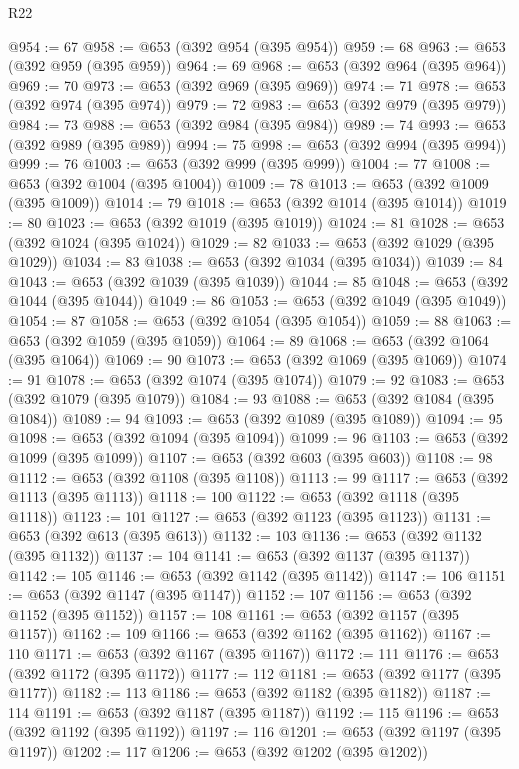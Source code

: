 \begin{lexlean}{R22}
\begin{coremodule}
@954 := 67
@958 := @653 (@392 @954 (@395 @954))
@959 := 68
@963 := @653 (@392 @959 (@395 @959))
@964 := 69
@968 := @653 (@392 @964 (@395 @964))
@969 := 70
@973 := @653 (@392 @969 (@395 @969))
@974 := 71
@978 := @653 (@392 @974 (@395 @974))
@979 := 72
@983 := @653 (@392 @979 (@395 @979))
@984 := 73
@988 := @653 (@392 @984 (@395 @984))
@989 := 74
@993 := @653 (@392 @989 (@395 @989))
@994 := 75
@998 := @653 (@392 @994 (@395 @994))
@999 := 76
@1003 := @653 (@392 @999 (@395 @999))
@1004 := 77
@1008 := @653 (@392 @1004 (@395 @1004))
@1009 := 78
@1013 := @653 (@392 @1009 (@395 @1009))
@1014 := 79
@1018 := @653 (@392 @1014 (@395 @1014))
@1019 := 80
@1023 := @653 (@392 @1019 (@395 @1019))
@1024 := 81
@1028 := @653 (@392 @1024 (@395 @1024))
@1029 := 82
@1033 := @653 (@392 @1029 (@395 @1029))
@1034 := 83
@1038 := @653 (@392 @1034 (@395 @1034))
@1039 := 84
@1043 := @653 (@392 @1039 (@395 @1039))
@1044 := 85
@1048 := @653 (@392 @1044 (@395 @1044))
@1049 := 86
@1053 := @653 (@392 @1049 (@395 @1049))
@1054 := 87
@1058 := @653 (@392 @1054 (@395 @1054))
@1059 := 88
@1063 := @653 (@392 @1059 (@395 @1059))
@1064 := 89
@1068 := @653 (@392 @1064 (@395 @1064))
@1069 := 90
@1073 := @653 (@392 @1069 (@395 @1069))
@1074 := 91
@1078 := @653 (@392 @1074 (@395 @1074))
@1079 := 92
@1083 := @653 (@392 @1079 (@395 @1079))
@1084 := 93
@1088 := @653 (@392 @1084 (@395 @1084))
@1089 := 94
@1093 := @653 (@392 @1089 (@395 @1089))
@1094 := 95
@1098 := @653 (@392 @1094 (@395 @1094))
@1099 := 96
@1103 := @653 (@392 @1099 (@395 @1099))
@1107 := @653 (@392 @603 (@395 @603))
@1108 := 98
@1112 := @653 (@392 @1108 (@395 @1108))
@1113 := 99
@1117 := @653 (@392 @1113 (@395 @1113))
@1118 := 100
@1122 := @653 (@392 @1118 (@395 @1118))
@1123 := 101
@1127 := @653 (@392 @1123 (@395 @1123))
@1131 := @653 (@392 @613 (@395 @613))
@1132 := 103
@1136 := @653 (@392 @1132 (@395 @1132))
@1137 := 104
@1141 := @653 (@392 @1137 (@395 @1137))
@1142 := 105
@1146 := @653 (@392 @1142 (@395 @1142))
@1147 := 106
@1151 := @653 (@392 @1147 (@395 @1147))
@1152 := 107
@1156 := @653 (@392 @1152 (@395 @1152))
@1157 := 108
@1161 := @653 (@392 @1157 (@395 @1157))
@1162 := 109
@1166 := @653 (@392 @1162 (@395 @1162))
@1167 := 110
@1171 := @653 (@392 @1167 (@395 @1167))
@1172 := 111
@1176 := @653 (@392 @1172 (@395 @1172))
@1177 := 112
@1181 := @653 (@392 @1177 (@395 @1177))
@1182 := 113
@1186 := @653 (@392 @1182 (@395 @1182))
@1187 := 114
@1191 := @653 (@392 @1187 (@395 @1187))
@1192 := 115
@1196 := @653 (@392 @1192 (@395 @1192))
@1197 := 116
@1201 := @653 (@392 @1197 (@395 @1197))
@1202 := 117
@1206 := @653 (@392 @1202 (@395 @1202))

\end{coremodule}
\end{lexlean}
